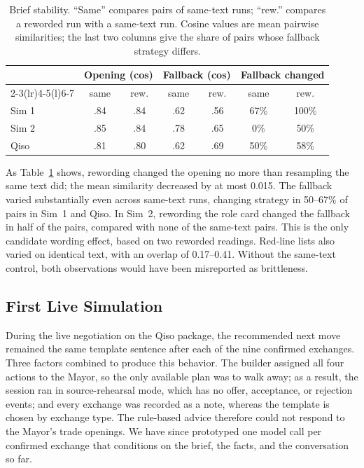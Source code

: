 \documentclass[10pt,twocolumn,letterpaper]{article}
\begin{document}
\begin{table}[t]
\centering\footnotesize
\setlength{\tabcolsep}{3pt}
\begin{tabular}{@{}lcccccc@{}}
\toprule
 & \multicolumn{2}{c}{Opening (cos)} & \multicolumn{2}{c}{Fallback (cos)} & \multicolumn{2}{c}{Fallback changed} \\
 \cmidrule(lr){2-3}\cmidrule(lr){4-5}\cmidrule(l){6-7}
 & same & rew. & same & rew. & same & rew. \\
\midrule
Sim 1 & .84 & .84 & .62 & .56 & 67\% & 100\% \\
Sim 2 & .85 & .84 & .78 & .65 & 0\% & 50\% \\
Qiso & .81 & .80 & .62 & .69 & 50\% & 58\% \\
\bottomrule
\end{tabular}
\caption{\footnotesize Brief stability. ``Same'' compares pairs of same-text runs; ``rew.'' compares a reworded run with a same-text run. Cosine values are mean pairwise similarities; the last two columns give the share of pairs whose fallback strategy differs.}
\label{tab:brief}
\end{table}

As Table~\ref{tab:brief} shows, rewording changed the opening no more than resampling the same text did; the mean similarity decreased by at most 0.015. The fallback varied substantially even across same-text runs, changing strategy in 50--67\% of pairs in Sim~1 and Qiso. In Sim~2, rewording the role card changed the fallback in half of the pairs, compared with none of the same-text pairs. This is the only candidate wording effect, based on two reworded readings. Red-line lists also varied on identical text, with an overlap of 0.17--0.41. Without the same-text control, both observations would have been misreported as brittleness.

\subsection{First Live Simulation}
During the live negotiation on the Qiso package, the recommended next move remained the same template sentence after each of the nine confirmed exchanges. Three factors combined to produce this behavior. The builder assigned all four actions to the Mayor, so the only available plan was to walk away; as a result, the session ran in source-rehearsal mode, which has no offer, acceptance, or rejection events; and every exchange was recorded as a note, whereas the template is chosen by exchange type. The rule-based advice therefore could not respond to the Mayor's trade openings. We have since prototyped one model call per confirmed exchange that conditions on the brief, the facts, and the conversation so far.
\end{document}
